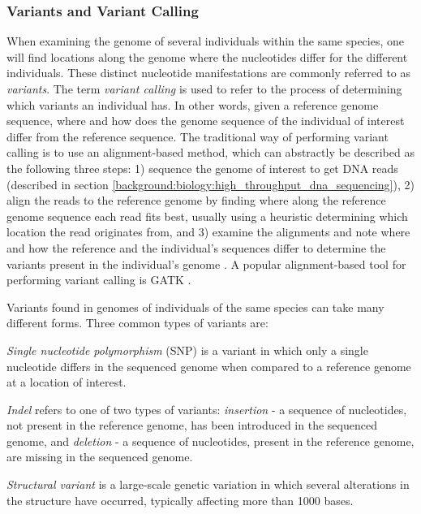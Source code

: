 \subsubsection{Variants and Variant Calling} \label{background:biology:variants_and_variant_calling}
When examining the genome of several individuals within the same species, one will find locations along the genome where the nucleotides differ for the different individuals.
These distinct nucleotide manifestations are commonly referred to as \textit{variants}.
The term \textit{variant calling} is used to refer to the process of determining which variants an individual has.
In other words, given a reference genome sequence, where and how does the genome sequence of the individual of interest differ from the reference sequence.
The traditional way of performing variant calling is to use an alignment-based method, which can abstractly be described as the following three steps:
1) sequence the genome of interest to get DNA reads (described in section \ref{background:biology:high_throughput_dna_sequencing}), 
2) align the reads to the reference genome by finding where along the reference genome sequence each read fits best, usually using a heuristic determining which location the read originates from, and 
3) examine the alignments and note where and how the reference and the individual's sequences differ to determine the variants present in the individual's genome \cite{variant_calling}.
A popular alignment-based tool for performing variant calling is GATK \cite{gatk}.

Variants found in genomes of individuals of the same species can take many different forms.
Three common types of variants are:
\begin{compactitem}
  \item \textit{Single nucleotide polymorphism} (SNP) is a variant in which only a single nucleotide differs in the sequenced genome when compared to a reference genome at a location of interest.
  \item \textit{Indel} refers to one of two types of variants: \textit{insertion} - a sequence of nucleotides, not present in the reference genome, has been introduced in the sequenced genome, and \textit{deletion} - a sequence of nucleotides, present in the reference genome, are missing in the sequenced genome.
  \item \textit{Structural variant} is a large-scale genetic variation in which several alterations in the structure have occurred, typically affecting more than 1000 bases.
\end{compactitem}


